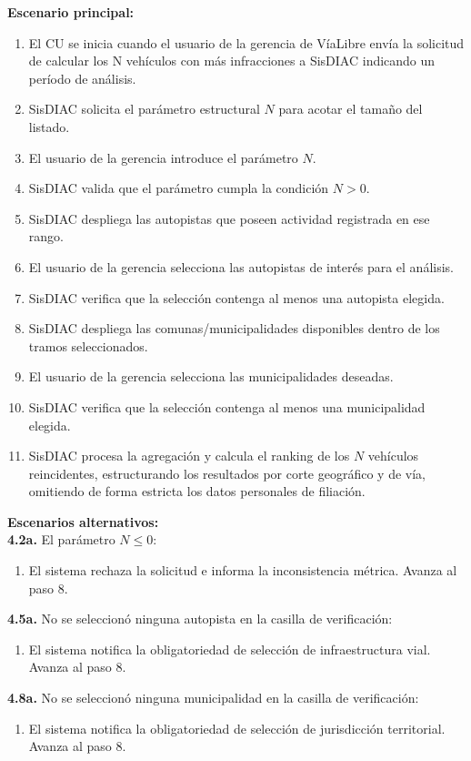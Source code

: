 \documentclass[12pt,letterpaper]{article}
\begin{document}
\noindent \textbf{Escenario principal:}
\begin{enumerate}[nosep, leftmargin=*]
	\item[1.] El CU se inicia cuando el usuario de la gerencia de VíaLibre envía la solicitud de calcular los N vehículos con más infracciones a SisDIAC indicando un período de análisis.
	\item[4.] SisDIAC solicita el parámetro estructural $N$ para acotar el tamaño del listado.
	\item[4.1.] El usuario de la gerencia introduce el parámetro $N$.
	\item[4.2.] SisDIAC valida que el parámetro cumpla la condición $N > 0$.
	\item[4.3.] SisDIAC despliega las autopistas que poseen actividad registrada en ese rango.
	\item[4.4.] El usuario de la gerencia selecciona las autopistas de interés para el análisis.
	\item[4.5.] SisDIAC verifica que la selección contenga al menos una autopista elegida.
	\item[4.6.] SisDIAC despliega las comunas/municipalidades disponibles dentro de los tramos seleccionados.
	\item[4.7.] El usuario de la gerencia selecciona las municipalidades deseadas.
	\item[4.8.] SisDIAC verifica que la selección contenga al menos una municipalidad elegida.
	\item[5.] SisDIAC procesa la agregación y calcula el ranking de los $N$ vehículos reincidentes, estructurando los resultados por corte geográfico y de vía, omitiendo de forma estricta los datos personales de filiación.
\end{enumerate}

\noindent \textbf{Escenarios alternativos:} \\
\textbf{4.2a.} El parámetro $N \leq 0$:
\begin{enumerate}[nosep]
	\item[4.2a1.] El sistema rechaza la solicitud e informa la inconsistencia métrica. Avanza al paso 8.
\end{enumerate}
\textbf{4.5a.} No se seleccionó ninguna autopista en la casilla de verificación:
\begin{enumerate}[nosep]
	\item[4.5a1.] El sistema notifica la obligatoriedad de selección de infraestructura vial. Avanza al paso 8.
\end{enumerate}
\textbf{4.8a.} No se seleccionó ninguna municipalidad en la casilla de verificación:
\begin{enumerate}[nosep]
	\item[4.8a1.] El sistema notifica la obligatoriedad de selección de jurisdicción territorial. Avanza al paso 8.
\end{enumerate}
\end{document}
